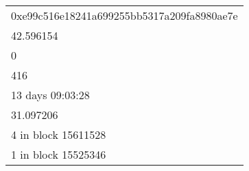 \begin{tabular}{l}
\toprule
                                           \\
\midrule
0xe99c516e18241a699255bb5317a209fa8980ae7e \\
                                 42.596154 \\
                                         0 \\
                                       416 \\
                          13 days 09:03:28 \\
                                 31.097206 \\
                       4 in block 15611528 \\
                       1 in block 15525346 \\
\bottomrule
\end{tabular}
